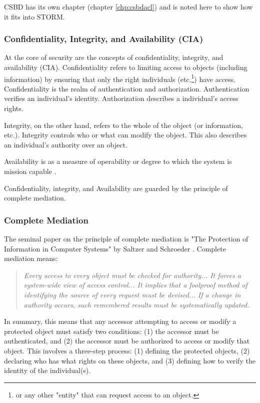 \documentclass[../../main/main.tex]{subfiles}
\begin{document}
CSBD has its own chapter (chapter \ref{chp:csbdacl}) and is noted here to show how it fits into STORM.

\subsubsection{Confidentiality, Integrity, and Availability (CIA) }\label{sssect:ssmts}
At the core of security are the concepts of confidentiality, integrity, and availability (CIA).  Confidentiality refers to limiting access to objects (including information) by ensuring that only the right individuals (etc.\footnote{or any other "entity" that can request access to an object.}) have access.  Confidentiality is the realm of authentication and authorization.  Authentication verifies an individual's identity.  Authorization describes a individual's access rights. 

Integrity, on the other hand, refers to the whole of the object (or information, etc.). Integrity controls who or what can modify the object. This also describes an individual's authority over an object.

Availability is as a measure of operability or degree to which the system is mission capable \cite {availability}. 

Confidentiality, integrity, and Availability are guarded by the principle of complete mediation.  


\subsubsection{Complete Mediation}\label{sssec:strommediate}
The seminal paper on the principle of complete mediation is "The Protection of Information in Computer Systems" by Saltzer and Schroeder \cite{saltzer}.  Complete mediation means:
\begin{quote}
\textit{
Every access to every object must be checked for authority... It forces a system-wide view of access control... It implies that a foolproof method of identifying the source of every request must be devised... If a change in authority occurs, such remembered results must be systematically updated.} 
\end{quote}

In summary, this means that any accessor attempting to access or modify a protected object must satisfy two conditions: (1) the accessor must be authenticated, and (2) the accessor must be authorized to access or modify that object.  This involves a three-step process: (1) defining the protected objects, (2) declaring who has what rights on these objects, and (3) defining how to verify the identity of the individual(s).  
\end{document}
